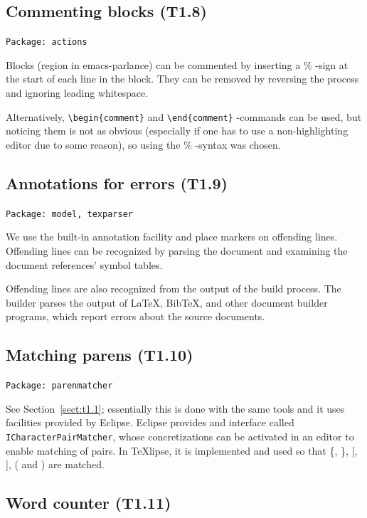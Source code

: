 \documentclass[a4paper,11pt,twoside]{article}
\newcommand{\texlipse}{\TeX lipse}
\begin{document}
\subsection{Commenting blocks (T1.8)}

\texttt{Package: actions}

Blocks (region in emacs-parlance) can be commented by inserting a 
\% -sign at the start of each line in the block. They can be removed 
by reversing the process and ignoring leading whitespace.

Alternatively, \verb+\begin{comment}+ and \verb+\end{comment}+ 
-commands can be used, but noticing them is not as obvious
(especially if one has to use a non-highlighting editor due to
some reason), so using the \% -syntax was chosen.


\subsection{Annotations for errors (T1.9)}

\texttt{Package: model, texparser}

We use the built-in annotation facility and place markers on offending
lines. Offending lines can be recognized by parsing the document and
examining the document references' symbol tables.

Offending lines are also recognized from the output of the build process.
The builder parses the output of \LaTeX, Bib\TeX, and other document
builder programs, which report errors about the source documents.


\subsection{Matching parens (T1.10)}

\texttt{Package: parenmatcher}

See Section~\ref{sect:t1.1}; essentially this is done with the same
tools and it uses facilities provided by Eclipse. Eclipse provides and interface
called \texttt{ICharacterPairMatcher}, whose concretizations can be activated in
an editor to enable matching of pairs. In \texlipse, it is implemented and used
so that \{, \}, [, ], ( and ) are matched.


\subsection{Word counter (T1.11)}
\end{document}

